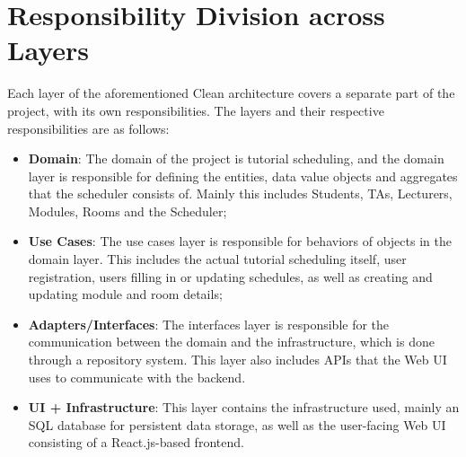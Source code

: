 \section{Responsibility Division across Layers}

Each layer of the aforementioned Clean architecture covers a separate part of the project, with its own responsibilities.
The layers and their respective responsibilities are as follows:

\begin{itemize}
\item \textbf{Domain}: The domain of the project is tutorial scheduling, and the domain layer is responsible for defining the entities, data value objects and aggregates that the scheduler consists of. Mainly this includes Students, TAs, Lecturers, Modules, Rooms and the Scheduler;
\item \textbf{Use Cases}: The use cases layer is responsible for behaviors of objects in the domain layer. This includes the actual tutorial scheduling itself, user registration, users filling in or updating schedules, as well as creating and updating module and room details;
\item \textbf{Adapters/Interfaces}: The interfaces layer is responsible for the communication between the domain and the infrastructure, which is done through a repository system. This layer also includes APIs that the Web UI uses to communicate with the backend.
\item \textbf{UI + Infrastructure}: This layer contains the infrastructure used, mainly an SQL database for persistent data storage, as well as the user-facing Web UI consisting of a React.js-based frontend.
\end{itemize}
